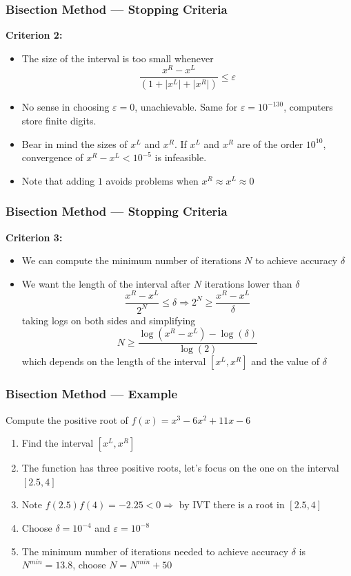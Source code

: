 \documentclass[11pt,xcolor={svgnames},aspectratio=169,usepdftitle=false,notheorems]{beamer}
\begin{document}
\begin{frame}
  \frametitle{Bisection Method --- Stopping Criteria}
\alert{\textbf{Criterion 2:}}
\begin{itemize}
  \item The size of the interval is too small whenever
  \[
  \frac{x^R - x^L}{(1 + \lvert x^L \rvert + \lvert x^R \rvert)} \leq \varepsilon
  \]
  \item No sense in choosing $\varepsilon = 0$, unachievable. Same for $\varepsilon = 10^{-130}$, computers store finite digits.
  \item Bear in mind the sizes of $x^L$ and $x^R$. {\tiny If $x^L$ and $x^R$ are of the order $10^{10}$, convergence of $x^R-x^L < 10^{-5}$ is infeasible.}
  \item Note that adding $1$ avoids problems when $x^R\approx x^L \approx 0$
\end{itemize}
\end{frame}

\begin{frame}
  \frametitle{Bisection Method --- Stopping Criteria}
\alert{\textbf{Criterion 3:}}
\begin{itemize}
  \item We can compute the minimum number of iterations $N$ to achieve accuracy $\delta$
  \item We want the length of the interval after $N$ iterations lower than $\delta$
  \[
  \frac{x^R - x^L}{2^N} \leq \delta \Rightarrow 2^N \geq \frac{x^R - x^L}{\delta}
  \]
  taking logs on both sides and simplifying
  \[
  N\geq \frac{\log(x^R - x^L) - \log(\delta)}{\log(2)}  
  \]
  which depends on the length of the interval $[x^L, x^R]$ and the value of $\delta$
\end{itemize}
\end{frame}

\begin{frame}
  \frametitle{Bisection Method --- Example}
Compute the positive root of $f(x) = x^3 - 6x^2 + 11x - 6$
\begin{enumerate}
  \item Find the interval $[x^L, x^R]$
  \item The function has three positive roots, let's focus on the one on the interval $[2.5, 4]$
  \item Note $f(2.5)f(4) = -2.25 < 0 \Rightarrow$ by IVT there is a root in $[2.5, 4]$
  \item Choose $\delta = 10^{-4}$ and $\varepsilon = 10^{-8}$
  \item The minimum number of iterations needed to achieve accuracy $\delta$ is $N^{min} = 13.8$, choose $N = N^{min} + 50$
\end{enumerate}
\end{frame}
\end{document}
